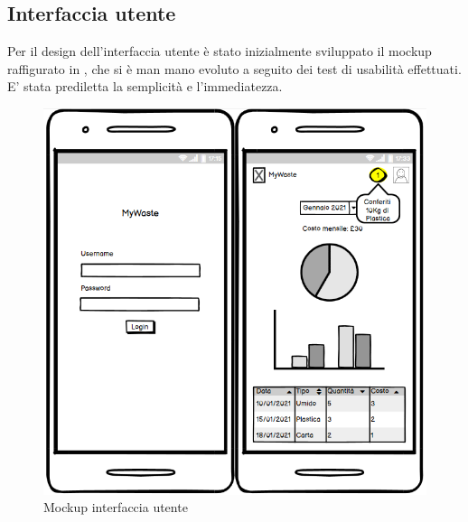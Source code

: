 \documentclass{report}
\begin{document}
\subsection{Interfaccia utente}
Per il design dell'interfaccia utente è stato inizialmente sviluppato il mockup raffigurato in , che si è
man mano evoluto a seguito dei test di usabilità effettuati. E' stata prediletta la semplicità e l'immediatezza.

\begin{figure}[h!]
    \centering
    \includegraphics[width=\textwidth]{mockup}
    \caption{Mockup interfaccia utente}
    \label{fig:mockup}
\end{figure}
\end{document}

